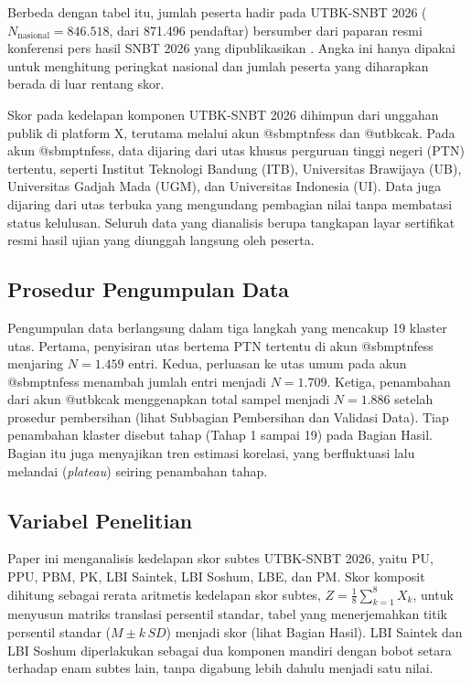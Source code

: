 Berbeda dengan tabel itu, jumlah peserta hadir pada UTBK-SNBT 2026 ($N_{\text{nasional}} = 846.518$, dari 871.496 pendaftar) bersumber dari paparan resmi konferensi pers hasil SNBT 2026 yang dipublikasikan \textcite{snpmb2026konferensi}. Angka ini hanya dipakai untuk menghitung peringkat nasional dan jumlah peserta yang diharapkan berada di luar rentang skor.

Skor pada kedelapan komponen UTBK-SNBT 2026 dihimpun dari unggahan publik di platform X, terutama melalui akun @sbmptnfess dan @utbkcak. Pada akun @sbmptnfess, data dijaring dari utas khusus perguruan tinggi negeri (PTN) tertentu, seperti Institut Teknologi Bandung (ITB), Universitas Brawijaya (UB), Universitas Gadjah Mada (UGM), dan Universitas Indonesia (UI). Data juga dijaring dari utas terbuka yang mengundang pembagian nilai tanpa membatasi status kelulusan. Seluruh data yang dianalisis berupa tangkapan layar sertifikat resmi hasil ujian yang diunggah langsung oleh peserta.

\subsection{Prosedur Pengumpulan Data}
Pengumpulan data berlangsung dalam tiga langkah yang mencakup 19 klaster utas. Pertama, penyisiran utas bertema PTN tertentu di akun @sbmptnfess menjaring $N = 1.459$ entri. Kedua, perluasan ke utas umum pada akun @sbmptnfess menambah jumlah entri menjadi $N = 1.709$. Ketiga, penambahan dari akun @utbkcak menggenapkan total sampel menjadi $N = 1.886$ setelah prosedur pembersihan (lihat Subbagian Pembersihan dan Validasi Data). Tiap penambahan klaster disebut tahap (Tahap 1 sampai 19) pada Bagian Hasil. Bagian itu juga menyajikan tren estimasi korelasi, yang berfluktuasi lalu melandai (\textit{plateau}) seiring penambahan tahap.

\subsection{Variabel Penelitian}
Paper ini menganalisis kedelapan skor subtes UTBK-SNBT 2026, yaitu PU, PPU, PBM, PK, LBI Saintek, LBI Soshum, LBE, dan PM. Skor komposit dihitung sebagai rerata aritmetis kedelapan skor subtes, $Z = \frac{1}{8}\sum_{k=1}^8 X_k$, untuk menyusun matriks translasi persentil standar, tabel yang menerjemahkan titik persentil standar ($M \pm k\,SD$) menjadi skor (lihat Bagian Hasil). LBI Saintek dan LBI Soshum diperlakukan sebagai dua komponen mandiri dengan bobot setara terhadap enam subtes lain, tanpa digabung lebih dahulu menjadi satu nilai.

